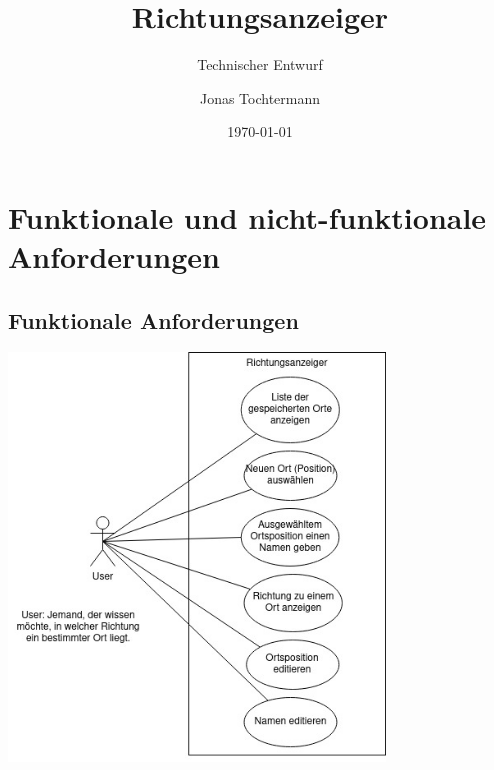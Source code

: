\documentclass[12pt,a4paper]{scrartcl}
\title{Richtungsanzeiger}
\subtitle{Technischer Entwurf}
\author{Jonas Tochtermann}
\date{\today}
\begin{document}
\maketitle

\section{Funktionale und nicht-funktionale Anforderungen}

\subsection{Funktionale Anforderungen}

\includegraphics[width=10.0cm]{../UseCase.jpg}

%
%
%
%
\end{document}
